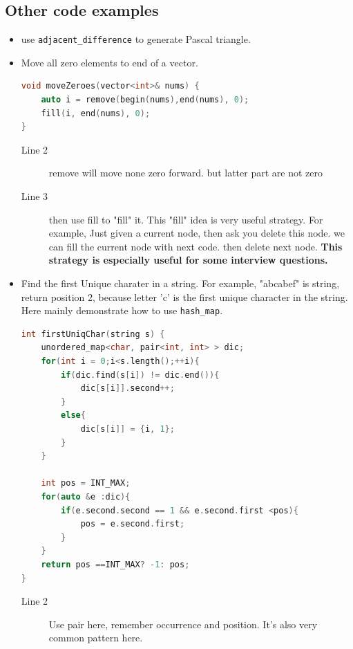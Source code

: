 \documentclass[a4paper,11pt,twoside]{book}
\begin{document}
\subsection{Other code examples}
\begin{itemize}

\item use \texttt{adjacent\_difference} to generate Pascal triangle. 	
	
\item Move all zero elements to end of a vector.
\begin{lstlisting}[frame=single, language=c++]	
void moveZeroes(vector<int>& nums) {
	auto i = remove(begin(nums),end(nums), 0);
	fill(i, end(nums), 0);
}	
\end{lstlisting}
\begin{description}
	\item[Line 2] remove will move none zero forward. but latter part are not zero
	\item[Line 3] then use fill to "fill" it. This "fill" idea is very useful strategy. For example, Just given a current node, then ask you delete this node. we can fill the current node with next code. then delete next node. \textbf{This strategy is especially useful for some interview questions.} 
	
\end{description}

\item Find the first Unique charater in a string. For example, "abcabef" is string, return position 2, because letter 'c' is the first unique character in the string. Here mainly demonstrate how to use \texttt{hash\_map}.
\begin{lstlisting}[frame=single, language=c++]	
int firstUniqChar(string s) {
	unordered_map<char, pair<int, int> > dic;
	for(int i = 0;i<s.length();++i){
		if(dic.find(s[i]) != dic.end()){
			dic[s[i]].second++;
		}
		else{
			dic[s[i]] = {i, 1};
		}
	}
	
	int pos = INT_MAX;
	for(auto &e :dic){
		if(e.second.second == 1 && e.second.first <pos){
			pos = e.second.first;
		}
	}
	return pos ==INT_MAX? -1: pos;
}
\end{lstlisting}
\begin{description}
	\item[Line 2] Use pair here, remember occurrence and position. It's also very common pattern here.	
\end{description}	



\end{itemize}
\end{document}
